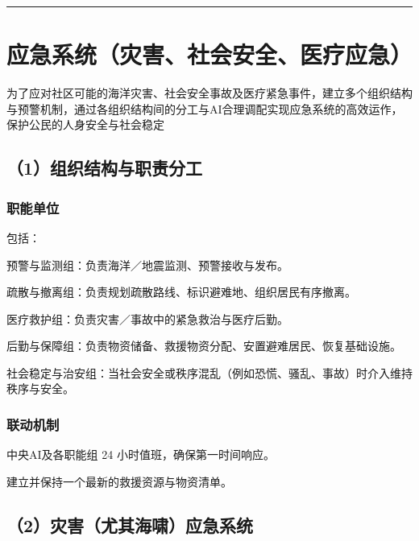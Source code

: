 \begin{center}\rule{0.5\linewidth}{0.5pt}\end{center}

\section{应急系统（灾害、社会安全、医疗应急）}\label{ux5e94ux6025ux7cfbux7edfux707eux5bb3ux793eux4f1aux5b89ux5168ux533bux7597ux5e94ux6025}

为了应对社区可能的海洋灾害、社会安全事故及医疗紧急事件，建立多个组织结构与预警机制，通过各组织结构间的分工与AI合理调配实现应急系统的高效运作，保护公民的人身安全与社会稳定

\subsection{（1）组织结构与职责分工}\label{ux7ec4ux7ec7ux7ed3ux6784ux4e0eux804cux8d23ux5206ux5de5}

\subsubsection{职能单位}\label{ux804cux80fdux5355ux4f4d}

包括：

预警与监测组：负责海洋／地震监测、预警接收与发布。

疏散与撤离组：负责规划疏散路线、标识避难地、组织居民有序撤离。

医疗救护组：负责灾害／事故中的紧急救治与医疗后勤。

后勤与保障组：负责物资储备、救援物资分配、安置避难居民、恢复基础设施。

社会稳定与治安组：当社会安全或秩序混乱（例如恐慌、骚乱、事故）时介入维持秩序与安全。

\subsubsection{联动机制}\label{ux8054ux52a8ux673aux5236}

中央AI及各职能组 24 小时值班，确保第一时间响应。

建立并保持一个最新的救援资源与物资清单。

\subsection{（2）灾害（尤其海啸）应急系统}\label{ux707eux5bb3ux5c24ux5176ux6d77ux5578ux5e94ux6025ux7cfbux7edf}

